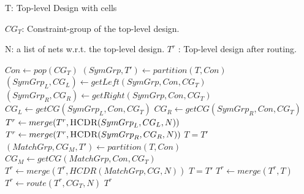       \renewcommand{\algorithmicrequire}{\textbf{Input:}}
      \renewcommand{\algorithmicensure}{\textbf{Output:}}
      \renewcommand{\algorithmiccomment}[1]{// #1}
      \newcommand{\HCDR}{\ensuremath{\mbox{\sc HCDR}}}
      \begin{algorithm}[t]
      \caption{$\HCDR(T,CG_T,N)$}\label{alg:HCDR}
      \begin{algorithmic}[1]
      \REQUIRE T: Top-level Design with cells 

      $CG_T$: Constraint-group of the top-level design.

      N: a list of nets w.r.t. the top-level design.
      \ENSURE $T^r$ : Top-level design after routing.
      \medskip

        \STATE $Con \gets pop(CG_T) $
          \STATE $(SymGrp,T') \gets partition(T,Con)$
          \STATE $({SymGrp}_L,CG_L) \gets getLeft(SymGrp,Con,CG_T)$
          \STATE $({SymGrp}_R,CG_R) \gets getRight(SymGrp,Con,CG_T)$
          \STATE ${CG}_L \gets getCG({SymGrp}_L,Con,CG_T)$
          \STATE ${CG}_R \gets getCG({SymGrp}_R,Con,CG_T)$
          \STATE $T^r \gets merge(T^r,\HCDR({SymGrp}_L,CG_L,N))$
          \STATE $T^r \gets merge(T^r,\HCDR({SymGrp}_R,CG_R,N))$
          \STATE $T = T'$
          \STATE $(MatchGrp,CG_M,T') \gets partition(T,Con)$
          \STATE $CG_M \gets getCG(MatchGrp,Con,CG_T)$
          \STATE $T^r \gets merge(T^r,HCDR(MatchGrp,CG,N))$
          \STATE $T = T'$
        \ENDIF
      \ENDWHILE
      \STATE $T^r \gets merge(T^r,T)$
      \STATE $T^r \gets route(T^r,CG_T,N)$
      \RETURN $T^r$ 
      \end{algorithmic}
      \end{algorithm}

